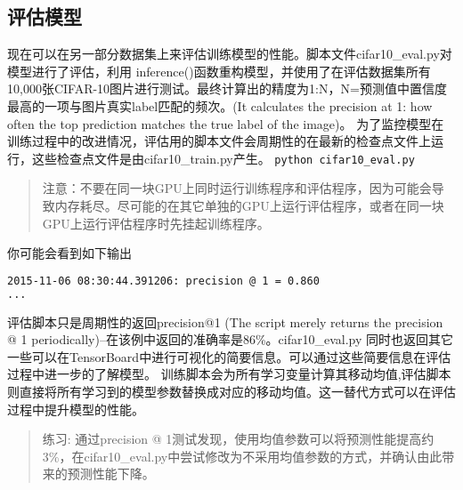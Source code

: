 {\subsection{评估模型}
现在可以在另一部分数据集上来评估训练模型的性能。脚本文件cifar10\_eval.py对模型进行了评估，利用 inference()函数重构模型，并使用了在评估数据集所有10,000张CIFAR-10图片进行测试。最终计算出的精度为1:N，N=预测值中置信度最高的一项与图片真实label匹配的频次。(It calculates the precision at 1: how often the top prediction matches the true label of the image)。
为了监控模型在训练过程中的改进情况，评估用的脚本文件会周期性的在最新的检查点文件上运行，这些检查点文件是由cifar10\_train.py产生。
\lstinline[language=Bash]{python cifar10_eval.py}
\begin{quote}
注意：不要在同一块GPU上同时运行训练程序和评估程序，因为可能会导致内存耗尽。尽可能的在其它单独的GPU上运行评估程序，或者在同一块GPU上运行评估程序时先挂起训练程序。
\end{quote}
你可能会看到如下输出
\begin{lstlisting}[language=Bash]
2015-11-06 08:30:44.391206: precision @ 1 = 0.860
...
\end{lstlisting}
评估脚本只是周期性的返回precision@1 (The script merely returns the precision @ 1 periodically)--在该例中返回的准确率是86\%。cifar10\_eval.py 同时也返回其它一些可以在TensorBoard中进行可视化的简要信息。可以通过这些简要信息在评估过程中进一步的了解模型。
训练脚本会为所有学习变量计算其移动均值,评估脚本则直接将所有学习到的模型参数替换成对应的移动均值。这一替代方式可以在评估过程中提升模型的性能。
\begin{quote}
练习: 通过precision @ 1测试发现，使用均值参数可以将预测性能提高约3\%，在cifar10\_eval.py中尝试修改为不采用均值参数的方式，并确认由此带来的预测性能下降。
\end{quote}
}
